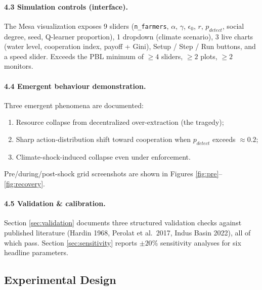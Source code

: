 \documentclass[12pt, a4paper]{article}
\begin{document}
\paragraph{4.3 Simulation controls (interface).} The Mesa visualization
exposes 9 sliders (\texttt{n\_farmers}, $\alpha$, $\gamma$, $\epsilon_0$,
$r$, $p_{detect}$, social degree, seed, Q-learner proportion), 1 dropdown
(climate scenario), 3 live charts (water level, cooperation index, payoff +
Gini), Setup / Step / Run buttons, and a speed slider. Exceeds the PBL
minimum of $\geq 4$ sliders, $\geq 2$ plots, $\geq 2$ monitors.

\paragraph{4.4 Emergent behaviour demonstration.} Three emergent phenomena
are documented:
\begin{enumerate}[label=(\roman*)]
    \item Resource collapse from decentralized over-extraction (the tragedy);
    \item Sharp action-distribution shift toward cooperation when $p_{detect}$
          exceeds $\approx 0.2$;
    \item Climate-shock-induced collapse even under enforcement.
\end{enumerate}
Pre/during/post-shock grid screenshots are shown in
Figures \ref{fig:pre}--\ref{fig:recovery}.

\paragraph{4.5 Validation \& calibration.} Section \ref{sec:validation}
documents three structured validation checks against published literature
(Hardin 1968, Perolat et al.\ 2017, Indus Basin 2022), all of which pass.
Section \ref{sec:sensitivity} reports $\pm 20\%$ sensitivity analyses for
six headline parameters.

\subsection{Experimental Design}
\end{document}

